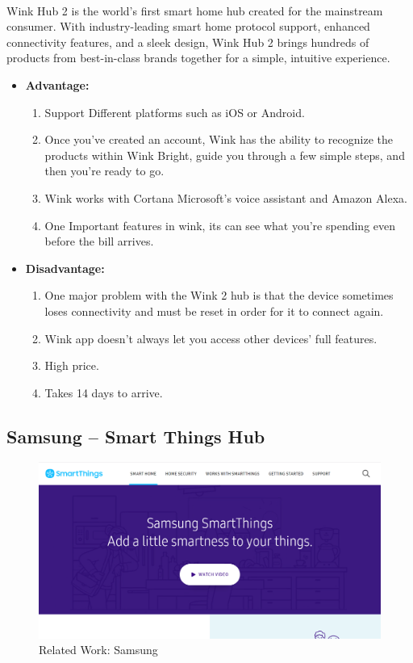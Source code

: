 \documentclass[12pt, oneside, a4paper]{book}
\newcommand\boldcolor[1]{\textcolor{bold}{\textbf{#1}}}
\begin{document}
		\paragraph{}Wink Hub 2 is the world’s first smart home hub created for the mainstream consumer. With industry-leading smart home protocol support, enhanced connectivity features, and a sleek design, Wink Hub 2 brings hundreds of products from best-in-class brands together for a simple, intuitive experience\cite{wink}.
		
		\begin{itemize}
			\item \boldcolor{Advantage:}
			\begin{enumerate}
				\item Support Different platforms such as iOS or Android.
				\item Once you've created an account, Wink has the ability to recognize the products within Wink Bright, guide you through a few simple steps, and then you're ready to go.
				\item Wink works with Cortana Microsoft’s voice assistant and Amazon Alexa.
				\item One Important features in wink, its can see what you’re spending even before the bill arrives.
			\end{enumerate}
			\item \boldcolor{Disadvantage:} 
			\begin{enumerate}
				\item One major problem with the Wink 2 hub is that the device sometimes loses connectivity and must be reset in order for it to connect again.
				\item Wink app doesn't always let you access other devices' full features.
				\item High price.
				\item Takes 14 days to arrive.
			\end{enumerate}
		\end{itemize}
		\newpage
		\subsection{Samsung – Smart Things Hub}
		\begin{figure}[H]
  			\caption{Related Work: Samsung}
			\includegraphics[width=\linewidth]{img/samsung.png}
		\end{figure}
\end{document}
